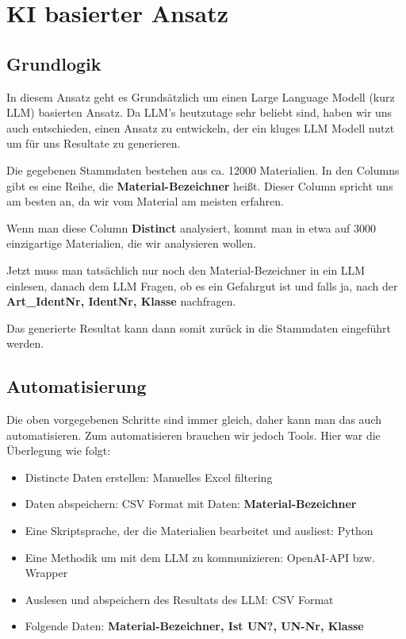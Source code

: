 \section{KI basierter Ansatz}
\subsection{Grundlogik}

In diesem Ansatz geht es Grundsätzlich um einen
Large Language Modell (kurz LLM) basierten Ansatz.
Da LLM's heutzutage sehr beliebt sind, haben wir uns auch entschieden,
einen Ansatz zu entwickeln, der ein kluges LLM Modell nutzt um für uns
Resultate zu generieren.

Die gegebenen Stammdaten bestehen aus ca. 12000 Materialien.
In den Columns gibt es eine Reihe, die \textbf{Material-Bezeichner} heißt.
Dieser Column spricht uns am besten an, da wir vom Material am meisten erfahren.

Wenn man diese Column \textbf{Distinct} analysiert, kommt man in etwa auf
3000 einzigartige Materialien, die wir analysieren wollen.

Jetzt muss man tatsächlich nur noch den Material-Bezeichner in ein LLM einlesen,
danach dem LLM Fragen, ob es ein Gefahrgut ist und falls ja, nach der
\textbf{Art_IdentNr, IdentNr, Klasse} nachfragen.

Das generierte Resultat kann dann somit zurück in die Stammdaten eingeführt werden.

\subsection{Automatisierung}

Die oben vorgegebenen Schritte sind immer gleich, daher kann man das auch automatisieren.
Zum automatisieren brauchen wir jedoch Tools. Hier war die Überlegung wie folgt:
\begin{itemize}
    \item Distincte Daten erstellen: Manuelles Excel filtering
    \item Daten abspeichern: CSV Format mit Daten: \textbf{Material-Bezeichner}
    \item Eine Skriptsprache, der die Materialien bearbeitet und ausliest: Python
    \item Eine Methodik um mit dem LLM zu kommunizieren: OpenAI-API bzw. Wrapper
    \item Auslesen und abspeichern des Resultats des LLM: CSV Format
    \item Folgende Daten: \textbf{Material-Bezeichner, Ist UN?, UN-Nr, Klasse}
\end{itemize}

